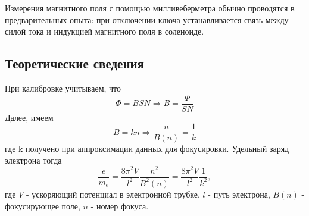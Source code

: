 \documentclass[a4paper, 12pt]{article}
\begin{document}
Измерения магнитного поля с помощью милливеберметра обычно проводятся в предварительных опыта: при отключении ключа устанавливается связь между силой тока и индукцией магнитного поля в соленоиде. 

\subsection{Теоретические сведения}
При калибровке учитываем, что 
\begin{equation}
	\Phi = BSN \Rightarrow B = \frac{\Phi}{SN}
\end{equation}
Далее, имеем
\begin{equation}
	B = kn \Rightarrow \frac{n}{B(n)} = \frac{1}{k}
\end{equation}
где k получено при аппроксимации данных для фокусировки. Удельный заряд электрона тогда
\begin{equation}
\dfrac{e}{m_e} = \dfrac{8\pi^2V}{l^2} \dfrac{n^2}{B^2(n)} = \dfrac{8\pi^2V}{l^2} \dfrac{1}{k^2},
\label{eq:main}
\end{equation}
где $V$ - ускоряющий потенциал в электронной трубке, $l$ - путь электрона, $B(n)$ - фокусирующее поле, $n$ - номер фокуса.
\end{document}
